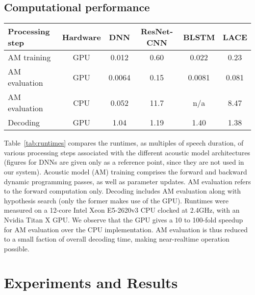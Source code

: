 \documentclass{article}
\begin{document}
\subsection{Computational performance}
\begin{table*}
	\centering
	\caption{Runtimes as factor of speech duration for various aspects of acoustic modeling and decoding,
		for different types of acoustic model}
	\label{tab:runtimes}
	\begin{tabular}{|l|c|c|c|c|c|}
	\hline
	Processing step		& Hardware	& DNN		& ResNet-CNN	& BLSTM		& LACE	\\
	\hline \hline
	AM training		& GPU		& 0.012		& 0.60		& 0.022		& 0.23	\\
	\hline
	AM evaluation		& GPU		& 0.0064	& 0.15		& 0.0081	& 0.081	\\
	\hline
	AM evaluation		& CPU		& 0.052		& 11.7		& n/a		& 8.47	\\
	\hline
	Decoding		& GPU		& 1.04		& 1.19		& 1.40		& 1.38	\\
	\hline
	\end{tabular}
\end{table*}
Table~\ref{tab:runtimes} compares the runtimes, as multiples of speech duration, of various processing steps
associated with the different acoustic model architectures
(figures for DNNs are given only as a reference point, since they are not used in our system).
Acoustic model (AM) training comprises the forward and backward dynamic programming passes, as well as parameter updates.
AM evaluation refers to the forward computation only.
Decoding includes AM evaluation along with hypothesis search (only the former makes use of the GPU).
Runtimes were measured on a 12-core Intel Xeon E5-2620v3 CPU clocked at 2.4GHz, with an Nvidia Titan X GPU.
We observe that the GPU gives a 10 to 100-fold speedup for AM evaluation over the CPU implementation.
AM evaluation is thus reduced to a small faction of overall decoding time, making near-realtime operation possible.
\section{Experiments and Results}
\label{sec:results}
\end{document}
